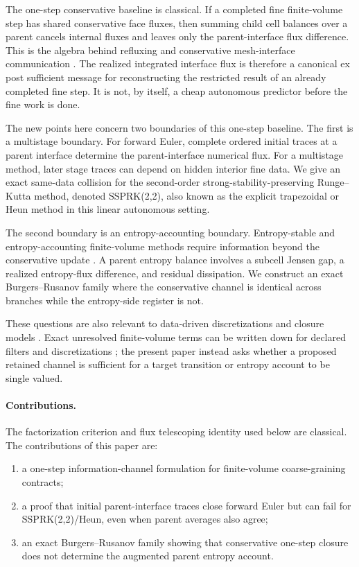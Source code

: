 \documentclass[a4paper,fleqn, sort&compress]{cas-sc}
\theoremstyle{remark}
\theoremstyle{definition}
\begin{document}
The one-step conservative baseline is classical.  If a completed fine
finite-volume step has shared conservative face fluxes, then summing child
cell balances over a parent cancels internal fluxes and leaves only the
parent-interface flux difference.  This is the algebra behind refluxing and
conservative mesh-interface communication \cite{Berger1987,
BergerColella1989}.  The realized integrated interface flux is therefore a
canonical ex post sufficient message for reconstructing the restricted result
of an already completed fine step.  It is not, by itself, a cheap autonomous
predictor before the fine work is done.

The new points here concern two boundaries of this one-step baseline.  The
first is a multistage boundary.  For forward Euler, complete ordered initial
traces at a parent interface determine the parent-interface numerical flux.
For a multistage method, later stage traces can depend on hidden interior
fine data. We give an exact same-data collision for the second-order
strong-stability-preserving Runge--Kutta method, denoted SSPRK(2,2), also
known as the explicit trapezoidal or Heun method in this linear autonomous setting.

The second boundary is an entropy-accounting boundary.  Entropy-stable and
entropy-accounting finite-volume methods require information beyond the
conservative update \cite{Tadmor1987,Tadmor2003,FjordholmMishraTadmor2012,
Lozano2018,RanochaSayyariDalcinParsaniKetcheson2020}.  A parent entropy
balance involves a subcell Jensen gap, a realized entropy-flux difference,
and residual dissipation.  We construct an exact Burgers--Rusanov family
where the conservative channel is identical across branches while the
entropy-side register is not.

These questions are also relevant to data-driven discretizations and closure
models \cite{BarSinai:2019datadriven,KochkovEtAl2021,
AgdesteinSanderse2025,SanderseEtAl2025}.  Exact unresolved finite-volume
terms can be written down for declared filters and discretizations
\cite{AgdesteinVerstappenSanderse2026}; the present paper instead asks
whether a proposed retained channel is sufficient for a target transition or
entropy account to be single valued.

\paragraph{Contributions.}
The factorization criterion and flux telescoping identity used below are
classical.  The contributions of this paper are:
\begin{enumerate}
\item a one-step information-channel formulation for finite-volume
coarse-graining contracts;
\item a proof that initial parent-interface traces close forward Euler but
can fail for SSPRK(2,2)/Heun, even when parent averages also agree;
\item an exact Burgers--Rusanov family showing that conservative one-step
closure does not determine the augmented parent entropy account.
\end{enumerate}
\end{document}

